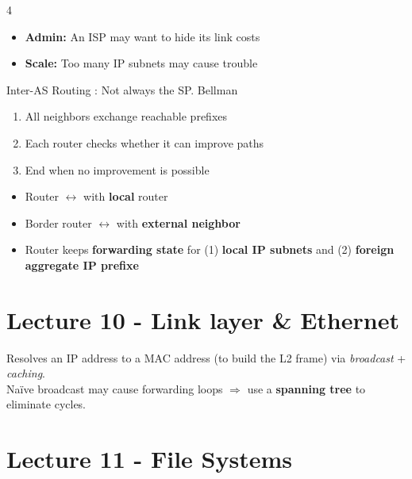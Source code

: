 \documentclass[8pt,a4paper,landscape]{extarticle}
\begin{document}
\begin{multicols*}{4}
\begin{thm}[title=Internet rounting challenges]
    \begin{itemize}
        \item \textbf{Admin:} An ISP may want to hide its link costs
        \item \textbf{Scale:} Too many IP subnets may cause trouble
    \end{itemize}
\end{thm}

\begin{prop}[title=Border Gateway Protocol (BGP)]
    Inter-AS Routing : Not always the SP. Bellman
    \begin{enumerate}
        \item All neighbors exchange reachable prefixes
        \item Each router checks whether it can improve paths
        \item End when no improvement is possible
    \end{enumerate}
\end{prop}

\begin{thm}[title=Internet rounting solutions]
    \begin{itemize}
        \item Router $\leftrightarrow$ with \textbf{local} router
        \item Border router $\leftrightarrow$ with \textbf{external neighbor}
        \item Router keeps \textbf{forwarding state} for (1) \textbf{local IP subnets} and (2) \textbf{foreign aggregate IP prefixe}
    \end{itemize}
\end{thm}

\section{Lecture 10 - Link layer \& Ethernet}

\begin{defn}[title=Address Resolution Protocol (ARP)]
    Resolves an IP address to a MAC address (to build the L2 frame) via \textit{broadcast} + \textit{caching}.\\
    Naïve broadcast may cause forwarding loops $\Rightarrow$ use a \textbf{spanning tree} to eliminate cycles.
\end{defn}

\section{Lecture 11 - File Systems}


\end{multicols*}
\end{document}
